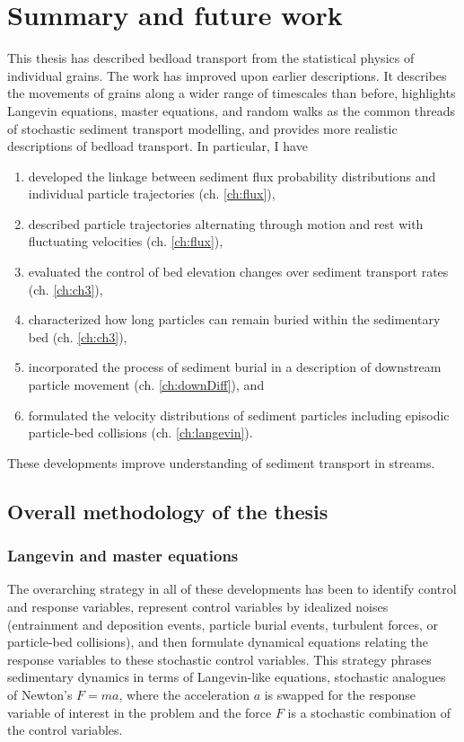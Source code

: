 
\chapter{Summary and future work}
\label{ch:conc}

This thesis has described bedload transport from the statistical physics of individual grains.
The work has improved upon earlier descriptions.
It describes the movements of grains along a wider range of timescales than before, highlights Langevin equations, master equations, and random walks as the common threads of stochastic sediment transport modelling, and provides more realistic descriptions of bedload transport. In particular, I have
\begin{enumerate}
	\item developed the linkage between sediment flux probability distributions and individual particle trajectories (ch. \ref{ch:flux}), 
	\item described particle trajectories alternating through motion and rest with fluctuating velocities (ch. \ref{ch:flux}),
	\item evaluated the control of bed elevation changes over sediment transport rates (ch. \ref{ch:ch3}),
	\item characterized how long particles can remain buried within the sedimentary bed (ch. \ref{ch:ch3}),
	\item incorporated the process of sediment burial in a description of downstream particle movement (ch. \ref{ch:downDiff}), and
	\item formulated the velocity distributions of sediment particles including episodic particle-bed collisions (ch. \ref{ch:langevin}).
\end{enumerate}
These developments improve understanding of sediment transport in streams.

\section{Overall methodology of the thesis}

\subsection{Langevin and master equations}

The overarching strategy in all of these developments has been to identify control and response variables, represent control variables by idealized noises (entrainment and deposition events, particle burial events, turbulent forces, or particle-bed collisions), and then formulate dynamical equations relating the response variables to these stochastic control variables.
This strategy phrases sedimentary dynamics in terms of Langevin-like equations, stochastic analogues of Newton's $F=ma$, where the acceleration $a$ is swapped for the response variable of interest in the problem and the force $F$ is a stochastic combination of the control variables. 

